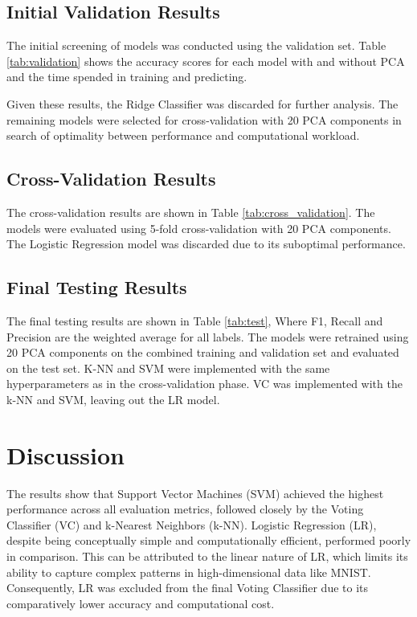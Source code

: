 \documentclass[twocolumn]{article}
\begin{document}
\subsection{Initial Validation Results}
The initial screening of models was conducted using the validation set. Table \ref{tab:validation}
 shows the accuracy scores for each model with and without PCA and the time spended in training and predicting. 
 
 Given these results, the Ridge Classifier was discarded for further analysis. The remaining models were selected for 
 cross-validation with 20 PCA components in search of optimality between performance and computational workload.


 

\subsection{Cross-Validation Results}

The cross-validation results are shown in Table \ref{tab:cross_validation}. The models were evaluated using 5-fold cross-validation with 20 PCA components. 
The Logistic Regression model was discarded due to its suboptimal performance.



\subsection{Final Testing Results}

The final testing results are shown in Table \ref{tab:test}, Where F1, Recall and Precision are the weighted average for all labels. 
The models were retrained using 20 PCA components on the combined training and validation set and evaluated on the test set. K-NN and SVM were implemented
with the same hyperparameters as in the cross-validation phase. VC was implemented with the k-NN and SVM, leaving out the LR model.


\section{Discussion}
The results show that Support Vector Machines (SVM) achieved the highest performance across all evaluation metrics, 
followed closely by the Voting Classifier (VC) and k-Nearest Neighbors (k-NN). Logistic Regression (LR), despite being 
conceptually simple and computationally efficient, performed poorly in comparison. This can be attributed to the linear 
nature of LR, which limits its ability to capture complex patterns in high-dimensional data like MNIST. Consequently, LR was 
excluded from the final Voting Classifier due to its comparatively lower accuracy and computational cost.
\end{document}

